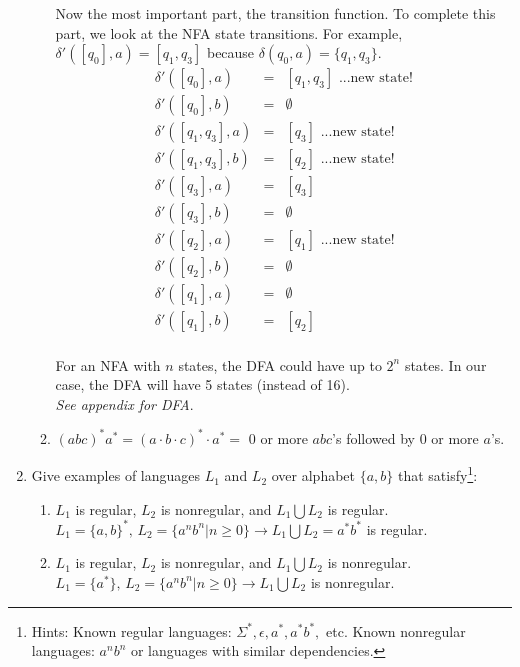\documentclass[10pt,a4paper,final]{article}
\begin{document}
\begin{enumerate}
\begin{enumerate}
  Now the most important part, the transition function.
  To complete this part, we look at the NFA state transitions.
  For example, $\delta'([q_0],a) = [q_1,q_3]$ because $\delta(q_0, a) = \{q_1,q_3\}$.
  \begin{eqnarray*}
  \delta'([q_0],a) &=& [q_1,q_3] \mbox{ ...new state!}\\
  \delta'([q_0],b) &=& \emptyset\\
  \delta'([q_1,q_3],a) &=& [q_3] \mbox{ ...new state!}\\
  \delta'([q_1,q_3],b) &=& [q_2] \mbox{ ...new state!}\\
  \delta'([q_3],a) &=& [q_3]\\
  \delta'([q_3],b) &=& \emptyset\\
  \delta'([q_2],a) &=& [q_1] \mbox{ ...new state!}\\
  \delta'([q_2],b) &=& \emptyset\\
  \delta'([q_1],a) &=& \emptyset\\
  \delta'([q_1],b) &=& [q_2]\\
  \end{eqnarray*}
  
  For an NFA with $n$ states, the DFA could have up to $2^n$ states.
  In our case, the DFA will have 5 states (instead of 16).\\
  
  \emph{See appendix for DFA}.\\
  
  \item $(abc)^* a^* = (a \cdot b \cdot c)^* \cdot a^* = $ 0 or more $abc$'s
  followed by 0 or more $a$'s.
  \end{enumerate}
  
\item %
Give examples of languages $L_1$ and $L_2$ over alphabet $\{a,b\}$ that satisfy\footnote{Hints:
Known regular languages: $\Sigma^*, \epsilon, a^*, a^* b^*,$ etc.
Known nonregular languages: $a^n b^n$ or languages with similar dependencies.}:
  \begin{enumerate}
  \item $L_1$ is regular, $L_2$ is nonregular, and $L_1 \bigcup L_2$ is regular.\\
  $L_1 = \{a,b\}^*,\, L_2 = \{a^n b^n | n \geq 0\} \rightarrow L_1 \bigcup L_2 = a^* b^*$ is regular.
  
  \item $L_1$ is regular, $L_2$ is nonregular, and $L_1 \bigcup L_2$ is nonregular.\\
  $L_1 = \{a^*\},\, L_2 = \{a^n b^n | n \geq 0\} \rightarrow L_1 \bigcup L_2$ is nonregular.
  

\end{enumerate}
\end{enumerate}
\end{document}
